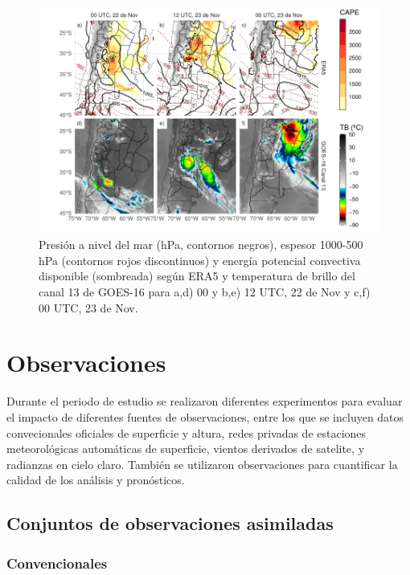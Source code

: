 \documentclass[12pt,oneside]{reedthesis}
\begin{document}
\begin{figure}

{\centering \includegraphics{thesis_files/figure-latex/caso-1} 

}

\caption{Presión a nivel del mar (hPa, contornos negros), espesor 1000-500 hPa (contornos rojos discontinuos) y energía potencial convectiva disponible (sombreada) según ERA5 y temperatura de brillo del canal 13 de GOES-16 para a,d) 00 y b,e) 12 UTC, 22 de Nov y c,f) 00 UTC, 23 de Nov.~}\label{fig:caso}
\end{figure}
\hypertarget{observaciones}{%
\section{Observaciones}\label{observaciones}}

Durante el periodo de estudio se realizaron diferentes experimentos para evaluar el impacto de diferentes fuentes de observaciones, entre los que se incluyen datos convecionales oficiales de superficie y altura, redes privadas de estaciones meteorológicas automáticas de superficie, vientos derivados de satelite, y radianzas en cielo claro. También se utilizaron observaciones para cuantificar la calidad de los análisis y pronósticos.

\hypertarget{conjuntos-de-observaciones-asimiladas}{%
\subsection{Conjuntos de observaciones asimiladas}\label{conjuntos-de-observaciones-asimiladas}}

\hypertarget{convencionales}{%
\subsubsection{Convencionales}\label{convencionales}}
\end{document}
